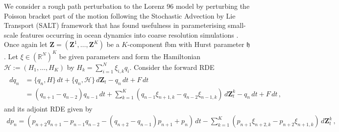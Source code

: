 \documentclass[11pt, oneside]{article}
\numberwithin{equation}{section}
\theoremstyle{definition}
\newcommand{\mc}[1]{\mathcal{#1}}
\newcommand{\mcal}[1]{\mc{#1}}
\begin{document}
We consider a rough path perturbation to the Lorenz 96 model by perturbing the Poisson bracket part of the motion following the Stochastic Advection by Lie Transport (SALT) framework \cite{Holm2015, DHL2024} that has found usefulness in parameterising small-scale features occurring in ocean dynamics into coarse resolution simulations \cite{HP2023}. Once again let $\mathbf{Z} = (\mathbf{Z}^1,\ldots,\mathbf{Z}^K)$ be a $K$-component fbm with Hurst parameter $\mathfrak{h}$. Let $\xi \in (\mathbb{R}^{N})^{K}$ be given parameters and form the Hamiltonian $\mcal{H} := (H_1,\ldots,H_K)$ by $H_k = \sum_{i=1}^N \xi_{i,k}q_i$. Consider the forward RDE
\begin{align}
\begin{split}
    d q_n &= \{q_n, H\}\,dt + \{q_n, \mcal{H}\}\,d\mathbf{Z}_t- q_{n}\,dt + F\,dt \\
    &= (q_{n+1} - q_{n-2})q_{n-1}\,dt + \sum_{k=1}^K\left(q_{n-1}\xi_{n+1, k} - q_{n-2}\xi_{n-1,k}\right)\,d\mathbf{Z}_t^k- q_{n}\,dt + F\,dt \,, \label{eq:SALT lorenz 96 forward}
\end{split}
\end{align}
and its adjoint RDE given by
\begin{align}
    d p_n = \left(p_{n+2}q_{n+1} -p_{n-1}q_{n-2} - (q_{n+2} - q_{n-1})p_{n+1} + p_n\right)\,dt - \sum_{k=1}^K\left(p_{n+1}\xi_{n+2, k} - p_{n+2}\xi_{n+1,k}\right)\,d\mathbf{Z}_t^k \,, \label{eq:SALT lorenz 96 adjoint}
\end{align}
\end{document}
